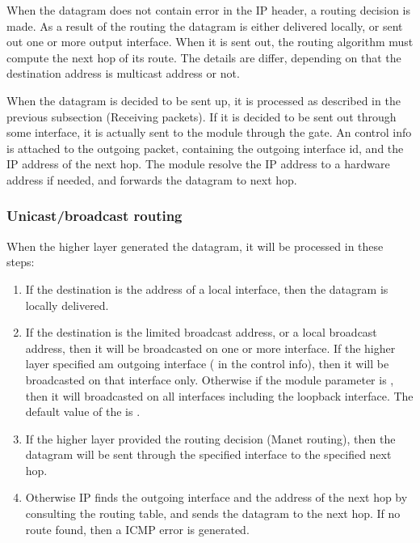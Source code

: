 
When the datagram does not contain error in the IP header,
a routing decision is made. As a result of the routing
the datagram is either delivered locally,
or sent out one or more output interface.
When it is sent out, the routing algorithm must compute the
next hop of its route. The details are differ, depending on
that the destination address is multicast address or not.

When the datagram is decided to be sent up, it is processed
as described in the previous subsection (Receiving packets).
If it is decided to be sent out through some interface, it
is actually sent to the  module through the
 gate. An  control
info is attached to the outgoing packet, containing the
outgoing interface id, and the IP address of the next hop.
The  module resolve the IP address to a hardware
address if needed, and forwards the datagram to next hop.

\subsubsection*{Unicast/broadcast routing}

When the higher layer generated the datagram, it will be processed
in these steps:
\begin{enumerate}
  \item If the destination is the address of a local interface,
  then the datagram is locally delivered.
  \item If the destination is the limited broadcast address, or a
  local broadcast address, then it will be broadcasted on one or more
  interface. If the higher layer specified am outgoing interface
  ( in the control info), then it will be broadcasted
  on that interface only. Otherwise if the  module
  parameter is , then it will broadcasted on all interfaces
  including the loopback interface. The default value of the
   is .
  \item If the higher layer provided the routing decision (Manet routing),
  then the datagram will be sent through the specified interface to the
  specified next hop.
  \item Otherwise IP finds the outgoing interface and the address of the
  next hop by consulting the routing table, and sends the datagram
  to the next hop. If no route
  found, then a  ICMP error is generated.
\end{enumerate}


